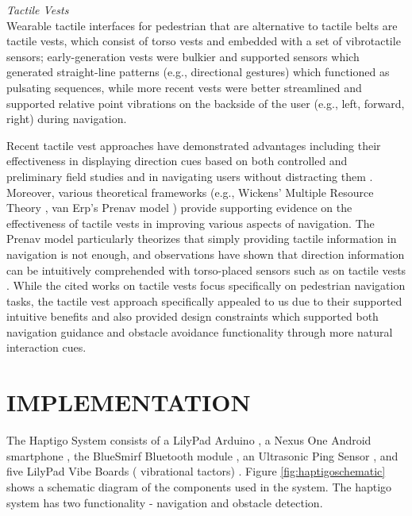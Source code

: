 \documentclass{sigchi}
\begin{document}
\textit{Tactile Vests}\\
Wearable tactile interfaces for pedestrian that are alternative to tactile belts are tactile vests, which consist of torso vests and embedded with a set of vibrotactile sensors; early-generation vests were bulkier and supported sensors which generated straight-line patterns (e.g., directional gestures) \cite{2004_Jones_HAPTICS, 2000_Ross_ASSETS} which functioned as pulsating sequences, while more recent vests were better streamlined and supported relative point vibrations on the backside of the user (e.g., left, forward, right) \cite{2012_Cummings_CHINZ, 2010_Elliott_IEEEHaptics, 2011_Elliott_HI} during navigation.

Recent tactile vest approaches have demonstrated advantages including their effectiveness in displaying direction cues based on both controlled and preliminary field studies \cite{2010_Elliott_IEEEHaptics} and in navigating users without distracting them \cite{2010_Pielot_Pervasive}.  Moreover, various theoretical frameworks (e.g., Wickens' Multiple Resource Theory \cite{2002_Wickens_ErgoScience}, van Erp's Prenav model \cite{2007_VanErp_Dissertation}) provide supporting evidence on the effectiveness of tactile vests in improving various aspects of navigation.  The Prenav model particularly theorizes that simply providing tactile information in navigation is not enough, and observations have shown that direction information can be intuitively comprehended with torso-placed sensors such as on tactile vests  \cite{2010_Elliott_IEEEHaptics}.  While the cited works on tactile vests focus specifically on pedestrian navigation tasks, the tactile vest approach specifically appealed to us due to their supported intuitive benefits and also provided design constraints which supported both navigation guidance and obstacle avoidance functionality through more natural interaction cues.


\section{IMPLEMENTATION}
The Haptigo System consists of a LilyPad Arduino \cite{Arduino}, a Nexus One Android smartphone \cite{Android}, the BlueSmirf Bluetooth module \cite{BlueSmirf}, an Ultrasonic Ping Sensor \cite{PingSensor}, and five LilyPad Vibe Boards ( vibrational tactors) \cite{VibeBoard}. Figure \ref{fig:haptigoschematic} shows a schematic diagram of the components used in the system. The haptigo system has two functionality - navigation and obstacle detection. 
\end{document}

